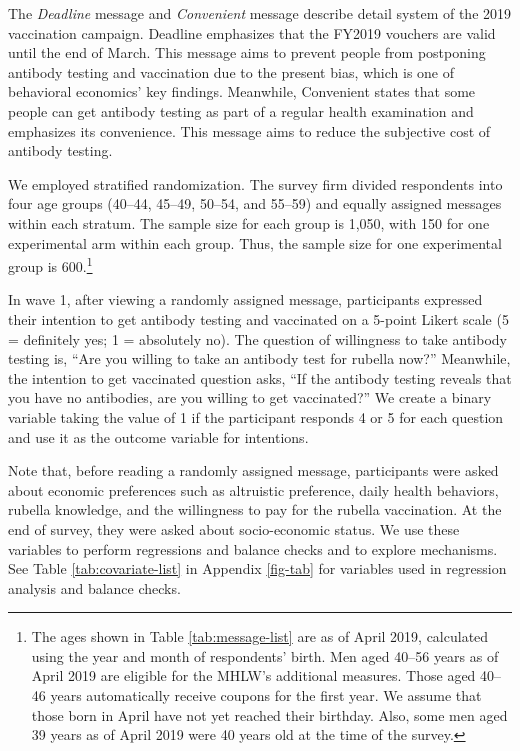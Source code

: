 \documentclass[
]{article}
\begin{document}
The \emph{Deadline} message and \emph{Convenient} message describe detail system of the 2019 vaccination campaign. Deadline emphasizes that the FY2019 vouchers are valid until the end of March. This message aims to prevent people from postponing antibody testing and vaccination due to the present bias, which is one of behavioral economics' key findings. Meanwhile, Convenient states that some people can get antibody testing as part of a regular health examination and emphasizes its convenience. This message aims to reduce the subjective cost of antibody testing.

We employed stratified randomization. The survey firm divided respondents into four age groups (40--44, 45--49, 50--54, and 55--59) and equally assigned messages within each stratum. The sample size for each group is 1,050, with 150 for one experimental arm within each group. Thus, the sample size for one experimental group is 600.\footnote{The ages shown in Table \ref{tab:message-list} are as of April 2019, calculated using the year and month of respondents' birth. Men aged 40--56 years as of April 2019 are eligible for the MHLW's additional measures. Those aged 40--46 years automatically receive coupons for the first year. We assume that those born in April have not yet reached their birthday. Also, some men aged 39 years as of April 2019 were 40 years old at the time of the survey.}

In wave 1, after viewing a randomly assigned message, participants expressed their intention to get antibody testing and vaccinated on a 5-point Likert scale (5 = definitely yes; 1 = absolutely no). The question of willingness to take antibody testing is, ``Are you willing to take an antibody test for rubella now?'' Meanwhile, the intention to get vaccinated question asks, ``If the antibody testing reveals that you have no antibodies, are you willing to get vaccinated?'' We create a binary variable taking the value of 1 if the participant responds 4 or 5 for each question and use it as the outcome variable for intentions.

Note that, before reading a randomly assigned message, participants were asked about economic preferences such as altruistic preference, daily health behaviors, rubella knowledge, and the willingness to pay for the rubella vaccination. At the end of survey, they were asked about socio-economic status. We use these variables to perform regressions and balance checks and to explore mechanisms. See Table \ref{tab:covariate-list} in Appendix \ref{fig-tab} for variables used in regression analysis and balance checks.
\end{document}
